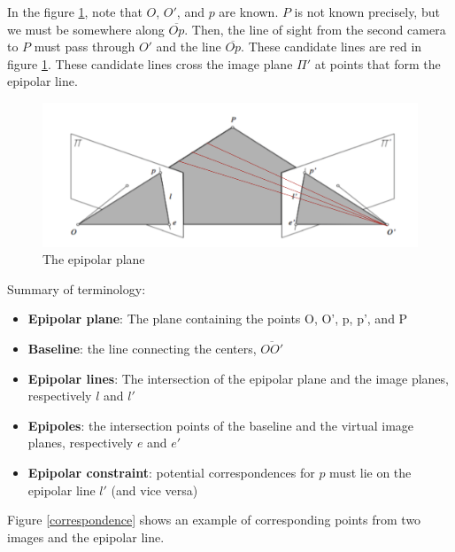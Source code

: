 \documentclass[twoside]{article}
\begin{document}
In the figure \ref{epi}, note that $O$, $O'$, and $p$ are known. $P$ is not known precisely, but we must be somewhere along $\overline{Op}$. Then, the line of sight from the second camera to $P$ must pass through $O'$ and the line $\overline{Op}$. These candidate lines are red in figure \ref{epi}. These candidate lines cross the image plane $\Pi'$ at points that form the epipolar line. 

\begin{figure}[h!]
  \begin{center}
	\includegraphics[scale=0.3]{epipolar.png}
  \end{center}
  \caption{The epipolar plane}
  \label{epi}
\end{figure}

Summary of terminology:
\begin{itemize}
\item \textbf{Epipolar plane}: The plane containing the points O, O', p, p', and P
\item \textbf{Baseline}: the line connecting the centers, $\overline{OO'}$
\item \textbf{Epipolar lines}: The intersection of the epipolar plane and the image planes, respectively $l$ and $l'$
\item \textbf{Epipoles}: the intersection points of the baseline and the virtual image planes, respectively $e$ and $e'$
\item \textbf{Epipolar constraint}: potential correspondences for $p$ must lie on the epipolar line $l'$ (and vice versa)
\end{itemize}

Figure \ref{correspondence} shows an example of corresponding points from two images and the epipolar line. 
\end{document}
